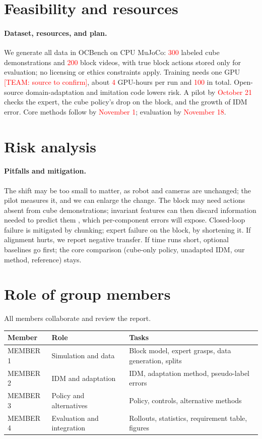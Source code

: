 \documentclass{article}
\newcommand{\decide}[1]{\textcolor{red}{[TEAM: #1]}}
\newcommand{\tbd}[1]{\textcolor{red}{#1}}
\newcommand{\member}[1]{\textcolor{teamlight}{#1}}
\begin{document}
\section*{Feasibility and resources}
\paragraph{Dataset, resources, and plan.}
We generate all data in OCBench on CPU MuJoCo: \tbd{300} labeled cube
demonstrations and \tbd{200} block videos, with true block actions stored only for
evaluation; no licensing or ethics constraints apply. Training needs one GPU
\decide{source to confirm}, about \tbd{4} GPU-hours per run and \tbd{100} in
total. Open-source domain-adaptation and imitation code lowers
risk. A pilot by
\tbd{October 21} checks the expert, the cube policy's drop on the block, and the
growth of IDM error. Core methods
follow by \tbd{November 1}; evaluation by \tbd{November 18}.

\section*{Risk analysis}
\paragraph{Pitfalls and mitigation.}
The shift may be too small to matter, as robot and cameras are unchanged; the
pilot measures it, and we can enlarge the change. The block may need actions
absent from cube demonstrations; invariant features can then discard information
needed to predict them \citep{zhao2019invariant}, which per-component errors will
expose. Closed-loop failure is mitigated by chunking; expert failure on the
block, by shortening it. If alignment hurts, we report negative transfer. If time runs short, optional
baselines go first; the core comparison (cube-only policy, unadapted IDM, our
method, reference) stays.

\section*{Role of group members}
All members collaborate and review the report.

\begin{center}
\small
\begin{tabular}{@{}>{\raggedright\arraybackslash}p{2.3cm}>{\raggedright\arraybackslash}p{3.3cm}>{\raggedright\arraybackslash}p{7.0cm}@{}}
\toprule
Member & Role & Tasks \\
\midrule
\member{MEMBER 1} & Simulation and data & Block model, expert grasps, data generation, splits \\
\member{MEMBER 2} & IDM and adaptation & IDM, adaptation method, pseudo-label errors \\
\member{MEMBER 3} & Policy and alternatives & Policy, controls, alternative methods \\
\member{MEMBER 4} & Evaluation and integration & Rollouts, statistics, requirement table, figures \\
\bottomrule
\end{tabular}
\end{center}
\end{document}
